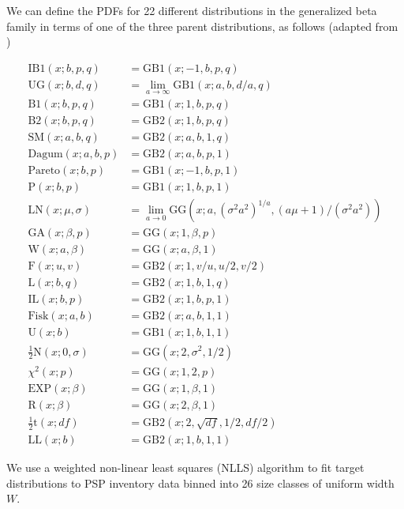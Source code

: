 \message{ !name(pspdistfit_article.tex)}\documentclass{article}
\begin{document}
We can define the PDFs for 22 different distributions in the generalized beta family in terms of one of the three parent distributions, as follows (adapted from \citealp{ducey2015sizebiased})

\begin{align}
\text{IB1}(x; b, p, q) &= \text{GB1}(x; -1, b, p, q) \\
\text{UG}(x; b, d, q) &= \lim_{a \to \infty} \text{GB1}(x; a, b, d/a, q) \\
\text{B1}(x; b, p, q) &= \text{GB1}(x; 1, b, p, q) \\
\text{B2}(x; b, p, q) &= \text{GB2}(x; 1, b, p, q) \\
\text{SM}(x; a, b, q) &= \text{GB2}(x; a, b, 1, q) \\
\text{Dagum}(x; a, b, p) &= \text{GB2}(x; a, b, p, 1) \\
\text{Pareto}(x; b, p) &= \text{GB1}(x; -1, b, p, 1) \\
\text{P}(x; b, p) &= \text{GB1}(x; 1, b, p, 1) \\
\text{LN}(x; \mu, \sigma) &= \lim_{a \to 0} \text{GG}(x; a, (\sigma^2 a^2)^{1/a}, (a\mu + 1)/(\sigma^2 a^2)) \\
\text{GA}(x; \beta, p) &= \text{GG}(x; 1, \beta, p) \\
\text{W}(x; a, \beta) &= \text{GG}(x; a, \beta, 1) \\
\text{F}(x; u, v) &= \text{GB2}(x; 1, v/u, u/2, v/2) \\
\text{L}(x; b, q) &= \text{GB2}(x; 1, b, 1, q) \\
\text{IL}(x; b, p) &= \text{GB2}(x; 1, b, p, 1) \\
\text{Fisk}(x; a, b) &= \text{GB2}(x; a, b, 1, 1) \\
\text{U}(x; b) &= \text{GB1}(x; 1, b, 1, 1) \\
\tfrac{1}{2}\text{N}(x; 0, \sigma) &= \text{GG}(x; 2, \sigma^2, 1/2) \\
\chi^2(x; p) &= \text{GG}(x; 1, 2, p) \\
\text{EXP}(x; \beta) &= \text{GG}(x; 1, \beta, 1) \\
\text{R}(x; \beta) &= \text{GG}(x; 2, \beta, 1) \\
\tfrac{1}{2}\text{t}(x; df) &= \text{GB2}(x; 2, \sqrt{df}, 1/2, df/2) \\
\text{LL}(x; b) &= \text{GB2}(x; 1, b, 1, 1)
\end{align}

We use a weighted non-linear least squares (NLLS) algorithm to fit target distributions to PSP inventory data binned into 26 size classes of uniform width $W$.
\end{document}
